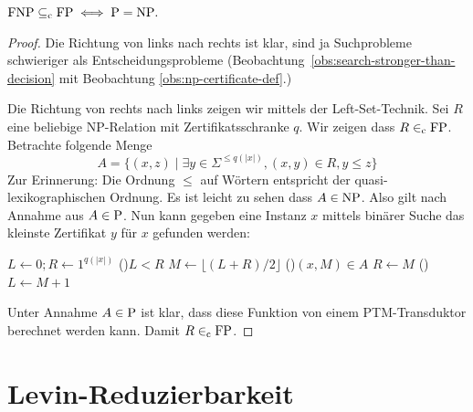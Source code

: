 \begin{lemma}
    $\mathrm{FNP}\subseteqc \FP \iff \P = \NP.$
\end{lemma}
\begin{proof}
    Die Richtung von links nach rechts ist klar, sind ja Suchprobleme schwieriger als Entscheidungsprobleme (Beobachtung~\ref{obs:search-stronger-than-decision} mit Beobachtung \ref{obs:np-certificate-def}.)

    Die Richtung von rechts nach links zeigen wir mittels der Left-Set-Technik. Sei $R$ eine beliebige NP-Relation mit Zertifikatsschranke $q$. Wir zeigen dass $R\inc\FP$.
    Betrachte folgende Menge
    \[ A = \{ (x, z) \mid \exists y\in\Sigma^{\leq q(|x|)}, (x,y)\in R, y\leq z \} \]
    Zur Erinnerung: Die Ordnung $\leq $ auf Wörtern entspricht der quasi-lexikographischen Ordnung.
    Es ist leicht zu sehen dass $A\in\NP$. Also gilt nach Annahme aus $A\in\P$.
    Nun kann gegeben eine Instanz $x$ mittels binärer Suche das kleinste Zertifikat $y$ für $x$ gefunden werden:\\
    \begin{algorithm}[H]
        $L\gets 0; R\gets 1^{q(|x|)}$\;
        \While(){$L<R$}
        {
            $M\gets \lfloor (L+R)/2 \rfloor$\;
            \uIf(){$(x, M)\in A$}{
                $R\gets M$\;
            }
            \Else(){
                $L\gets M+1$\;
            }
        }
    \end{algorithm}
    Unter Annahme $A\in\P$ ist klar, dass diese Funktion von einem PTM-Transduktor berechnet werden kann. Damit $R\inc\FP$.
\end{proof}


\section{Levin-Reduzierbarkeit}

